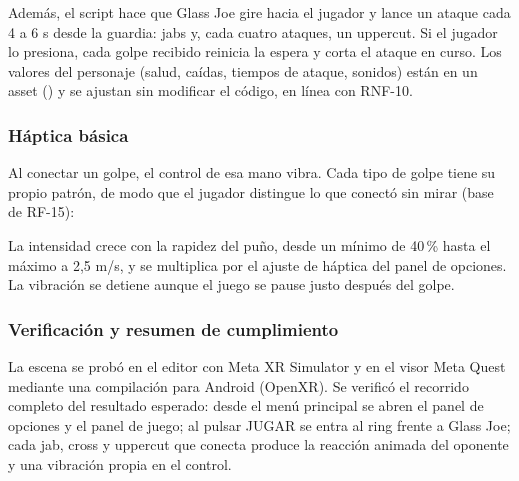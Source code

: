 Además, el script  hace que Glass Joe gire hacia el jugador y lance un ataque cada 4 a 6 s desde la guardia: jabs y, cada cuatro ataques, un uppercut. Si el jugador lo presiona, cada golpe recibido reinicia la espera y corta el ataque en curso. Los valores del personaje (salud, caídas, tiempos de ataque, sonidos) están en un asset  () y se ajustan sin modificar el código, en línea con RNF-10.

\subsubsection*{Háptica básica}
Al conectar un golpe, el control de esa mano vibra. Cada tipo de golpe tiene su propio patrón, de modo que el jugador distingue lo que conectó sin mirar (base de RF-15):

\begin{table}[H]
\centering
\caption{Vibración por tipo de golpe conectado.}
\end{table}

La intensidad crece con la rapidez del puño, desde un mínimo de 40\,\% hasta el máximo a 2,5 m/s, y se multiplica por el ajuste de háptica del panel de opciones. La vibración se detiene aunque el juego se pause justo después del golpe.

\subsubsection*{Verificación y resumen de cumplimiento}
La escena se probó en el editor con Meta XR Simulator y en el visor Meta Quest mediante una compilación para Android (OpenXR). Se verificó el recorrido completo del resultado esperado: desde el menú principal se abren el panel de opciones y el panel de juego; al pulsar JUGAR se entra al ring frente a Glass Joe; cada jab, cross y uppercut que conecta produce la reacción animada del oponente y una vibración propia en el control.

